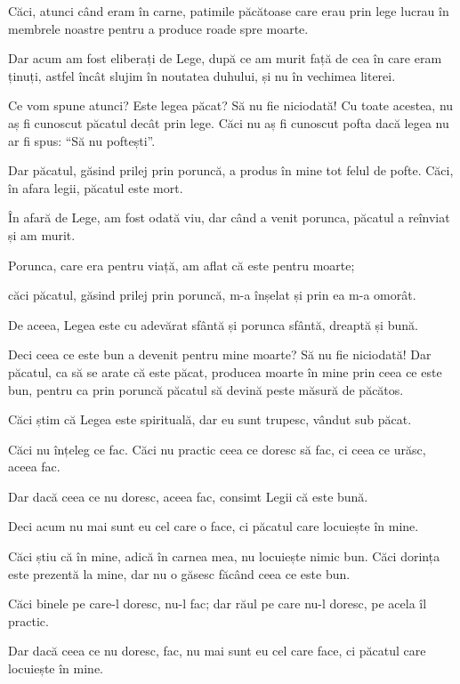 {Căci, atunci când eram în carne, patimile păcătoase care erau prin lege lucrau în membrele noastre pentru a produce roade spre moarte.

Dar acum am fost eliberați de Lege, după ce am murit față de cea în care eram ținuți, astfel încât slujim în noutatea duhului, și nu în vechimea literei.


\par }{\PP {}Ce vom spune atunci? Este legea păcat? Să nu fie niciodată! Cu toate acestea, nu aș fi cunoscut păcatul decât prin lege. Căci nu aș fi cunoscut pofta dacă legea nu ar fi spus: “Să nu poftești”.

Dar păcatul, găsind prilej prin poruncă, a produs în mine tot felul de pofte. Căci, în afara legii, păcatul este mort.

În afară de Lege, am fost odată viu, dar când a venit porunca, păcatul a reînviat și am murit.

Porunca, care era pentru viață, am aflat că este pentru moarte;

căci păcatul, găsind prilej prin poruncă, m-a înșelat și prin ea m-a omorât.

De aceea, Legea este cu adevărat sfântă și porunca sfântă, dreaptă și bună.


\par }{\PP {}Deci ceea ce este bun a devenit pentru mine moarte? Să nu fie niciodată! Dar păcatul, ca să se arate că este păcat, producea moarte în mine prin ceea ce este bun, pentru ca prin poruncă păcatul să devină peste măsură de păcătos.

Căci știm că Legea este spirituală, dar eu sunt trupesc, vândut sub păcat.

Căci nu înțeleg ce fac. Căci nu practic ceea ce doresc să fac, ci ceea ce urăsc, aceea fac.

Dar dacă ceea ce nu doresc, aceea fac, consimt Legii că este bună.

Deci acum nu mai sunt eu cel care o face, ci păcatul care locuiește în mine.

Căci știu că în mine, adică în carnea mea, nu locuiește nimic bun. Căci dorința este prezentă la mine, dar nu o găsesc făcând ceea ce este bun.

Căci binele pe care-l doresc, nu-l fac; dar răul pe care nu-l doresc, pe acela îl practic.

Dar dacă ceea ce nu doresc, fac, nu mai sunt eu cel care face, ci păcatul care locuiește în mine.

}
